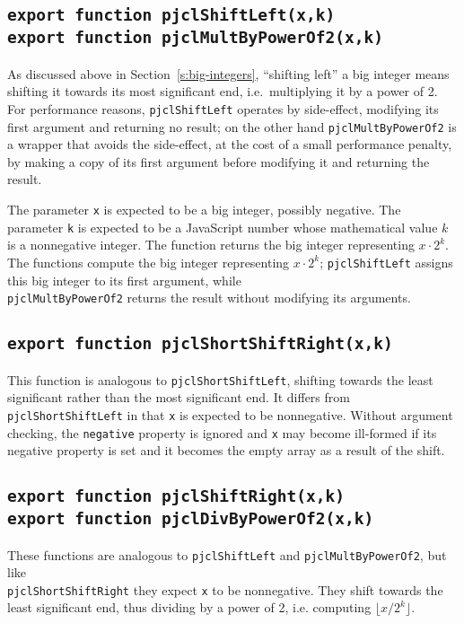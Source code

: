 \documentclass[12pt]{article}
\begin{document}
\subsection{\tt export function pjclShiftLeft(x,k)\\export function pjclMultByPowerOf2(x,k)}

As discussed above in Section~\ref{s:big-integers}, ``shifting left'' a big integer
means shifting it towards its most significant end, i.e.\ multiplying it by a power of 2.
For performance reasons, {\tt pjclShiftLeft} operates by side-effect, modifying its first argument and returning no result; on the other hand {\tt pjclMultByPowerOf2} is a wrapper that avoids the side-effect, at the cost of a small performance penalty, by making a copy of its first argument before modifying it and returning the result.

The parameter {\tt x} is expected to be a big integer, possibly negative.  The parameter {\tt k} is expected to be a JavaScript number
whose mathematical value $k$ is a nonnegative integer.  The function
returns the big integer representing $x\cdot2^k$.  The functions compute the big integer representing
$x\cdot2^k$; {\tt pjclShiftLeft} assigns this big integer to its first argument,
while\\{\tt pjclMultByPowerOf2} returns the result without modifying its arguments.

\subsection{\tt export function pjclShortShiftRight(x,k)}

This function is analogous to {\tt pjclShortShiftLeft}, shifting towards the least significant rather than the most significant end.  It differs from {\tt pjclShortShiftLeft} in that {\tt x} is expected to be nonnegative. Without argument checking, the {\tt negative} property is ignored and {\tt x} may become ill-formed if its negative property is set and it becomes the empty array as a result of the shift.

\subsection{\tt export function pjclShiftRight(x,k)\\export function pjclDivByPowerOf2(x,k)}

These functions are analogous to {\tt pjclShiftLeft} and {\tt pjclMultByPowerOf2}, 
but like\\
{\tt pjclShortShiftRight} they expect {\tt x} to be nonnegative.  They shift towards the least significant end, thus dividing by a power of 2, i.e. computing $\lfloor
x/2^k \rfloor$.
\end{document}
